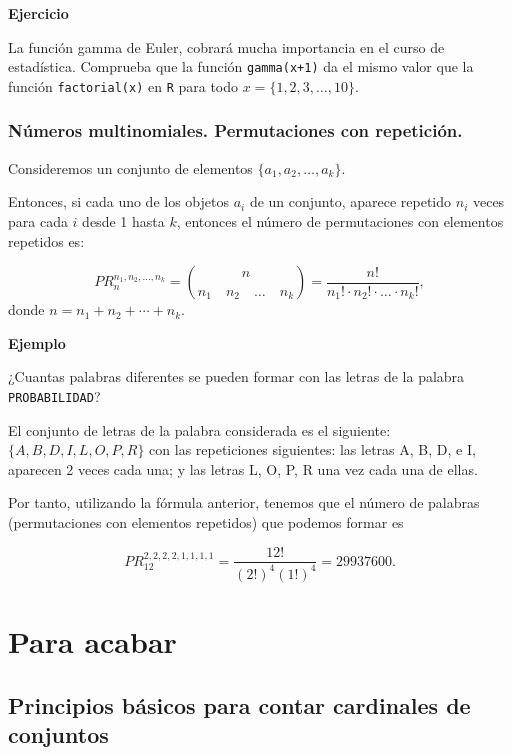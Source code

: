 \documentclass[
  letterpaper,
  DIV=11,
  numbers=noendperiod]{scrreprt}
\begin{document}
\textbf{Ejercicio}

La función gamma de Euler, cobrará mucha importancia en el curso de
estadística. Comprueba que la función \texttt{gamma(x+1)} da el mismo
valor que la función \texttt{factorial(x)} en \texttt{R} para todo
\(x = \{1,2,3,\ldots,10\}\).

\subsection{Números multinomiales. Permutaciones con
repetición.}\label{nuxfameros-multinomiales.-permutaciones-con-repeticiuxf3n.}

Consideremos un conjunto de elementos \(\{a_1, a_2, \ldots, a_k\}\).

Entonces, si cada uno de los objetos \(a_i\) de un conjunto, aparece
repetido \(n_i\) veces para cada \(i\) desde 1 hasta \(k\), entonces el
número de permutaciones con elementos repetidos es:

\[PR_n^{n_1,n_2,\ldots,n_k} = {{n}\choose {n_1\quad n_2 \quad\ldots \quad n_k}}=\frac{n!}{n_1!\cdot n_2!\cdot \ldots \cdot n_k!},\]
donde \(n=n_1+n_2+\cdots+n_k\).

\textbf{Ejemplo}

¿Cuantas palabras diferentes se pueden formar con las letras de la
palabra \texttt{PROBABILIDAD}?

El conjunto de letras de la palabra considerada es el siguiente:
\(\{A, B, D, I, L, O, P, R\}\) con las repeticiones siguientes: las
letras A, B, D, e I, aparecen 2 veces cada una; y las letras L, O, P, R
una vez cada una de ellas.

Por tanto, utilizando la fórmula anterior, tenemos que el número de
palabras (permutaciones con elementos repetidos) que podemos formar es

\[PR^{2,2,2,2,1,1,1,1}_{12} = \frac{12!}{(2!)^4(1!)^4} = 29937600.\]


\chapter{Para acabar}\label{para-acabar}

\section{Principios básicos para contar cardinales de
conjuntos}\label{principios-buxe1sicos-para-contar-cardinales-de-conjuntos}
\end{document}

